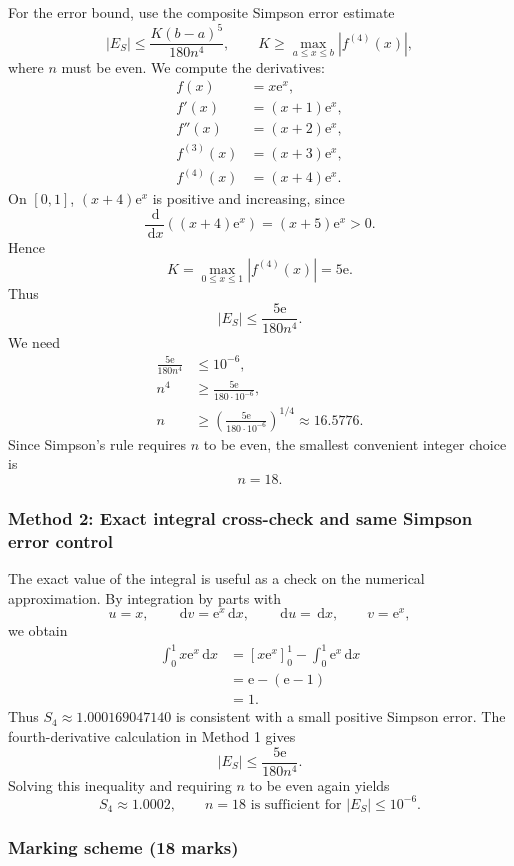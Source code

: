 \documentclass[12pt]{article}
\newcommand{\dd}{\,\mathrm{d}}
\newcommand{\ee}{\mathrm{e}}
\newcommand{\abs}[1]{\left|#1\right|}
\begin{document}
\begin{enumerate}[label=(\alph*)]
For the error bound, use the composite Simpson error estimate
\[
\abs{E_S}\leq \frac{K(b-a)^5}{180n^4},
\qquad K\geq \max_{a\leq x\leq b}\abs{f^{(4)}(x)},
\]
where $n$ must be even. We compute the derivatives:
\begin{align*}
f(x)&=x\ee^x, \\
f'(x)&=(x+1)\ee^x, \\
f''(x)&=(x+2)\ee^x, \\
f^{(3)}(x)&=(x+3)\ee^x, \\
f^{(4)}(x)&=(x+4)\ee^x.
\end{align*}
On $[0,1]$, $(x+4)\ee^x$ is positive and increasing, since
\[
\frac{\dd}{\dd x}\left((x+4)\ee^x\right)=(x+5)\ee^x>0.
\]
Hence
\[
K=\max_{0\leq x\leq 1}\abs{f^{(4)}(x)}=5\ee.
\]
Thus
\[
\abs{E_S}\leq \frac{5\ee}{180n^4}.
\]
We need
\begin{align*}
\frac{5\ee}{180n^4}&\leq 10^{-6}, \\
n^4&\geq \frac{5\ee}{180\cdot 10^{-6}}, \\
n&\geq \left(\frac{5\ee}{180\cdot 10^{-6}}\right)^{1/4}\approx 16.5776.
\end{align*}
Since Simpson's rule requires $n$ to be even, the smallest convenient integer choice is
\[
\boxed{n=18.}
\]
\end{enumerate}

\newpage
\subsubsection{Method 2: Exact integral cross-check and same Simpson error control}

The exact value of the integral is useful as a check on the numerical approximation. By integration by parts with
\[
u=x,\qquad \dd v=\ee^x\dd x,\qquad \dd u=\dd x,\qquad v=\ee^x,
\]
we obtain
\begin{align*}
\int_0^1 x\ee^x\dd x
&=\left[x\ee^x\right]_0^1-\int_0^1 \ee^x\dd x \\
&=\ee-(\ee-1) \\
&=1.
\end{align*}
Thus $S_4\approx 1.000169047140$ is consistent with a small positive Simpson error. The fourth-derivative calculation in Method 1 gives
\[
\abs{E_S}\leq \frac{5\ee}{180n^4}.
\]
Solving this inequality and requiring $n$ to be even again yields
\[
\boxed{S_4\approx 1.0002,
\qquad n=18\text{ is sufficient for }\abs{E_S}\leq 10^{-6}.}
\]

\subsubsection{Marking scheme (18 marks)}
\end{document}
